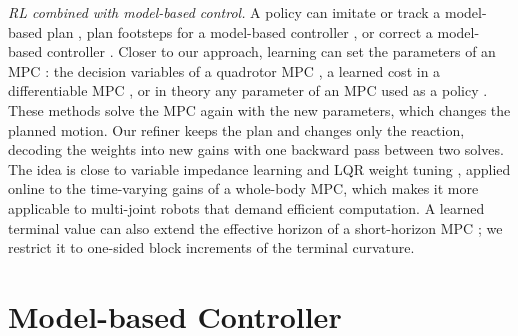 \documentclass[conference]{IEEEtran}
\begin{document}
\emph{RL combined with model-based control.}
A policy can imitate or track a model-based plan \cite{carius2020mpcnet,reske2021imitation,jenelten2024dtc,kang2023rlmodel}, plan footsteps for a model-based controller \cite{gangapurwala2022rloc}, or correct a model-based controller \cite{cheng2025rambo,jeon2025residualmpc}.
Closer to our approach, learning can set the parameters of an MPC \cite{hewing2020lbmpc}: the decision variables of a quadrotor MPC \cite{song2022policysearch}, a learned cost in a differentiable MPC \cite{amos2018diffmpc,romero2024acmpc}, or in theory any parameter of an MPC used as a policy \cite{gros2020nmpcrl}.
These methods solve the MPC again with the new parameters, which changes the planned motion.
Our refiner keeps the plan and changes only the reaction, decoding the weights into new gains with one backward pass between two solves.
The idea is close to variable impedance learning \cite{buchli2011variable} and LQR weight tuning \cite{marco2016lqr}, applied online to the time-varying gains of a whole-body MPC, which makes it more applicable to multi-joint robots that demand efficient computation.
A learned terminal value can also extend the effective horizon of a short-horizon MPC \cite{lowrey2019polo}; we restrict it to one-sided block increments of the terminal curvature.

\section{Model-based Controller}
\label{sec:base}
\end{document}
